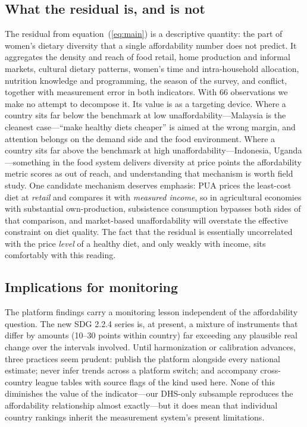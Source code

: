 \documentclass[11pt]{article}
\begin{document}
\subsection{What the residual is, and is not}
The residual from equation~(\ref{eq:main}) is a descriptive quantity: the part of women's dietary diversity that a single affordability number does not predict. It aggregates the density and reach of food retail, home production and informal markets, cultural dietary patterns, women's time and intra-household allocation, nutrition knowledge and programming, the season of the survey, and conflict, together with measurement error in both indicators. With 66 observations we make no attempt to decompose it. Its value is as a targeting device. Where a country sits far below the benchmark at low unaffordability---Malaysia is the cleanest case---``make healthy diets cheaper'' is aimed at the wrong margin, and attention belongs on the demand side and the food environment. Where a country sits far above the benchmark at high unaffordability---Indonesia, Uganda---something in the food system delivers diversity at price points the affordability metric scores as out of reach, and understanding that mechanism is worth field study. One candidate mechanism deserves emphasis: PUA prices the least-cost diet at \emph{retail} and compares it with \emph{measured income}, so in agricultural economies with substantial own-production, subsistence consumption bypasses both sides of that comparison, and market-based unaffordability will overstate the effective constraint on diet quality. The fact that the residual is essentially uncorrelated with the price \emph{level} of a healthy diet, and only weakly with income, sits comfortably with this reading.

\subsection{Implications for monitoring}
The platform findings carry a monitoring lesson independent of the affordability question. The new SDG 2.2.4 series is, at present, a mixture of instruments that differ by amounts (10--30 points within country) far exceeding any plausible real change over the intervals involved. Until harmonization or calibration advances, three practices seem prudent: publish the platform alongside every national estimate; never infer trends across a platform switch; and accompany cross-country league tables with source flags of the kind used here. None of this diminishes the value of the indicator---our DHS-only subsample reproduces the affordability relationship almost exactly---but it does mean that individual country rankings inherit the measurement system's present limitations.
\end{document}
